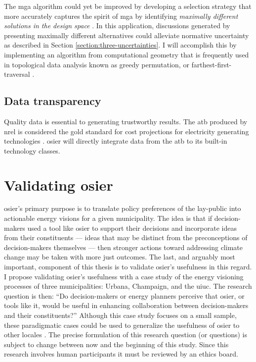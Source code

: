 The \ac{mga} algorithm could yet be improved by developing a selection strategy
that more accurately captures the spirit of \ac{mga} by identifying 
\textit{maximally different solutions in the design space} 
\cite{decarolis_using_2011,yue_review_2018}. In this application, discussions
generated by presenting maximally different alternatives could alleviate
normative uncertainty as described in Section \ref{section:three-uncertainties}.
I will accomplish this by implementing an algorithm from computational geometry
that is frequently used in topological data analysis known as greedy
permutation, or farthest-first-traversal
\cite{cavanna_geometric_2015,eppstein_approximate_2020}.


\subsection{Data transparency}

Quality data is essential to generating trustworthy results. The \ac{atb}
produced by \ac{nrel} is considered the gold standard for cost projections for
electricity generating technologies \cite{nrel_2020_2020}. \ac{osier} will
directly integrate data from the \ac{atb} to its built-in technology classes.


\section{Validating \ac{osier}}

\ac{osier}'s primary purpose is to translate policy preferences of the
lay-public into actionable energy visions for a given municipality. The idea is
that if decision-makers used a tool like \ac{osier} to support their decisions
and incorporate ideas from their constituents --- ideas that may be distinct
from the preconceptions of decision-makers themselves --- then stronger actions
toward addressing climate change may be taken with more just outcomes. The last,
and arguably most important, component of this thesis is to validate
\ac{osier}'s usefulness in this regard. I propose validating \ac{osier}'s
usefulness with a case study of the energy visioning processes of three
municipalities: Urbana, Champaign, and the \ac{uiuc}. The research question is
then: ``Do decision-makers or energy planners perceive that \ac{osier}, or tools
like it, would be useful in enhancing collaboration between decision-makers and
their constituents?'' Although this case study focuses on a small sample, these
paradigmatic cases could be used to generalize the usefulness of \ac{osier} to
other locales \cite{flyvbjerg_five_2006}. The precise formulation of this
research question (or questions) is subject to change between now and the
beginning of this study. Since this research involves human participants it must
be reviewed by an ethics board.

